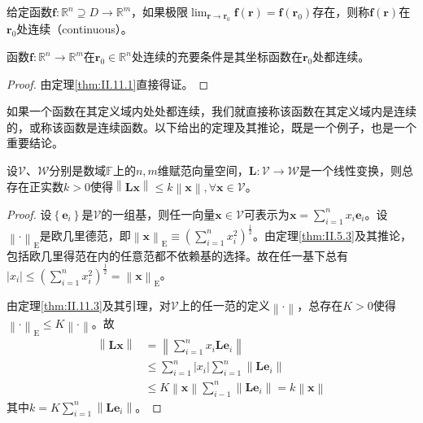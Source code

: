 \documentclass[main.tex]{subfiles}
\begin{document}
\begin{definition}[函数的连续性]\label{II.11.2}
给定函数$\mathbf{f}:\mathbb{R}^n\supseteq D\rightarrow\mathbb{R}^m$，如果极限$\lim_{\mathbf{r}\to\mathbf{r}_0}\mathbf{f}\left(\mathbf{r}\right)=\mathbf{f}\left(\mathbf{r}_0\right)$存在，则称$\mathbf{f}\left(\mathbf{r}\right)$在$\mathbf{r}_0$处连续（continuous）。
\end{definition}

\begin{theorem}\label{thm:II.11.2}
函数$\mathbf{f}:\mathbb{R}^n\rightarrow\mathbb{R}^m$在$\mathbf{r}_0\in\mathbb{R}^n$处连续的充要条件是其坐标函数在$\mathbf{r}_0$处都连续。
\end{theorem}
\begin{proof}
由定理\ref{thm:II.11.1}直接得证。
\end{proof}

如果一个函数在其定义域内处处都连续，我们就直接称该函数在其定义域内是连续的，或称该函数是连续函数。以下给出的定理及其推论，既是一个例子，也是一个重要结论。

\begin{theorem}\label{thm:II.11.3}
设$\mathcal{V}$、$\mathcal{W}$分别是数域$\mathbb{F}$上的$n,m$维赋范向量空间，$\mathbf{L}:\mathcal{V}\rightarrow\mathcal{W}$是一个线性变换，则总存在正实数$k>0$使得$\left\|\mathbf{Lx}\right\|\leq k\left\|\mathbf{x}\right\|,\forall\mathbf{x}\in\mathcal{V}$。
\end{theorem}
\begin{proof}
设$\left\{\mathbf{e}_i\right\}$是$\mathcal{V}$的一组基，则任一向量$\mathbf{x}\in\mathcal{V}$可表示为$\mathbf{x}=\sum_{i=1}^nx_i\mathbf{e}_i$。设$\left\|\cdot\right\|_\mathrm{E}$是欧几里德范，即$\left\|\mathbf{x}\right\|_\mathrm{E}\equiv\left(\sum_{i=1}^nx_i^2\right)^\frac{1}{2}$。由定理\ref{thm:II.5.3}及其推论，包括欧几里得范在内的任意范都不依赖基的选择。故在任一基下总有$\left|x_i\right|\leq\left(\sum_{i=1}^nx_i^2\right)^\frac{1}{2}=\left\|\mathbf{x}\right\|_\mathrm{E}$。

由定理\ref{thm:II.11.3}及其引理，对$\mathcal{V}$上的任一范的定义$\left\|\cdot\right\|$，总存在$K>0$使得$\left\|\cdot\right\|_\mathrm{E}\leq K\left\|\cdot\right\|$。故
\begin{align*}
    \left\|\mathbf{Lx}\right\|&=\left\|\sum_{i=1}^nx_i\mathbf{Le}_i\right\|\\
    &\leq\sum_{i=1}^n\left|x_i\right|\sum_{i=1}^n\left\|\mathbf{Le}_i\right\|\\
    &\leq K\left\|\mathbf{x}\right\|\sum_{i-1}^n\left\|\mathbf{Le}_i\right\|=k\left\|\mathbf{x}\right\|
\end{align*}
其中$k=K\sum_{i=1}^n\left\|\mathbf{Le}_i\right\|$。
\end{proof}
\end{document}
